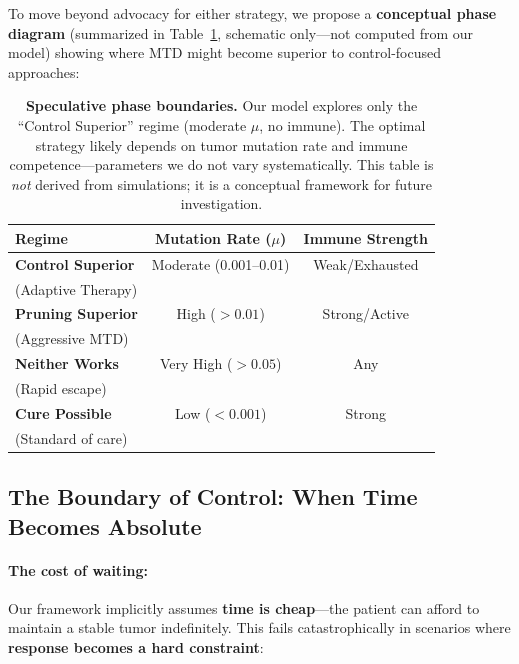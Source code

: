 \documentclass[11pt,a4paper]{article}
\begin{document}
To move beyond advocacy for either strategy, we propose a \textbf{conceptual phase diagram} (summarized in Table~\ref{tab:phase_boundaries}, schematic only---not computed from our model) showing where MTD might become superior to control-focused approaches:

\begin{table}[h]
\centering
\small
\begin{tabular}{|l|c|c|}
\hline
\textbf{Regime} & \textbf{Mutation Rate ($\mu$)} & \textbf{Immune Strength} \\
\hline
\textbf{Control Superior} & Moderate (0.001--0.01) & Weak/Exhausted \\
(Adaptive Therapy) & & \\
\hline
\textbf{Pruning Superior} & High ($>0.01$) & Strong/Active \\
(Aggressive MTD) & & \\
\hline
\textbf{Neither Works} & Very High ($>0.05$) & Any \\
(Rapid escape) & & \\
\hline
\textbf{Cure Possible} & Low ($<0.001$) & Strong \\
(Standard of care) & & \\
\hline
\end{tabular}
\caption{\textbf{Speculative phase boundaries.} Our model explores only the ``Control Superior'' regime (moderate $\mu$, no immune). The optimal strategy likely depends on tumor mutation rate and immune competence---parameters we do not vary systematically. This table is \textit{not} derived from simulations; it is a conceptual framework for future investigation.}
\label{tab:phase_boundaries}
\end{table}

\subsection{The Boundary of Control: When Time Becomes Absolute}

\paragraph{The cost of waiting:} Our framework implicitly assumes \textbf{time is cheap}---the patient can afford to maintain a stable tumor indefinitely. This fails catastrophically in scenarios where \textbf{response becomes a hard constraint}:
\end{document}
